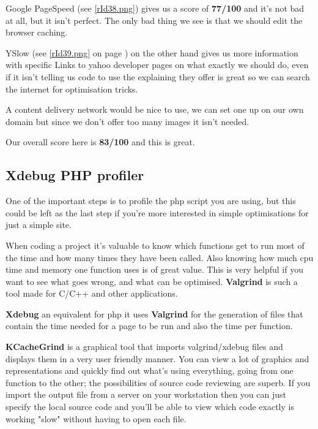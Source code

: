 Google PageSpeed (see \autoref{rId38.png}) gives us a score of \textbf{77/100} and it's not bad at all, but it isn't perfect. The only bad thing we see is that we should edit the browser caching. 

YSlow (see \autoref{rId39.png} on page \pageref{rId39.png}) on the other hand gives us more information with specific Links to yahoo developer pages on what exactly we should do, even if it isn't telling us code to use the explaining they offer is great so we can search the internet for optimisation tricks.

A content delivery network would be nice to use, we can set one up on our own domain but since we don't offer too many images it isn't needed.

Our overall score here is \textbf{83/100} and this is great.
\newpage{}

\subsection{Xdebug PHP profiler}
One of the important steps is to profile the \gls{php} script you are using, but this could be left as the last step if you're more interested in simple optimisations for just a simple site.

When coding a project it's valuable to know which functions get to run most of the time and how many times they have been called. Also knowing how much \gls{cpu} time and memory one function uses is of great value. This is very helpful if you want to see what goes wrong, and what can be optimised. \textbf{Valgrind} is such a tool made for C/C++ and other applications.

\textbf{Xdebug} an equivalent for \gls{php} it uses \textbf{Valgrind} for the generation of files that contain the time needed for a page to be run and also the time per function. 

\textbf{KCacheGrind} is a graphical tool that imports valgrind/xdebug files and displays them in a very user friendly manner. You can view a lot of graphics and representations and quickly find out what's using everything, going from one function to the other; the possibilities of source code reviewing are superb. If you import the output file from a server on your workstation then you can just specify the local source code and you'll be able to view which code exactly is working "slow" without having to open each file.

